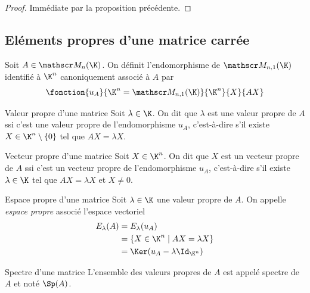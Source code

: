 \begin{proof}
    Immédiate par la proposition précédente. 
\end{proof}

\subsection{Eléments propres d'une matrice carrée }

\begin{definition}{}{}
    Soit $A \in \mathscr M_n(\K)$. On définit l'endomorphisme de $\mathscr M_{n, 1}(\K)$
    identifié à $\K^n$ canoniquement associé à $A$ par 
    $$\fonction{u_A}{\K^n = \mathscr M_{n, 1}(\K)}{\K^n}{X}{AX}$$
\end{definition}

\begin{definition}{Valeur propre d'une matrice}{}
    Soit $\lambda \in \K$. On dit que $\lambda$ est une valeur propre de $A$ ssi
    c'est une valeur propre de l'endomorphisme $u_A$, c'est-à-dire s'il existe 
    $X \in \K^n \setminus \{0\}$ tel que $AX = \lambda X$.
\end{definition}

\begin{definition}{Vecteur propre d'une matrice}{}
    Soit $X \in \K^n$. On dit que $X$ est un vecteur propre de $A$ ssi
    c'est un vecteur propre de l'endomorphisme $u_A$, c'est-à-dire s'il existe 
    $\lambda \in \K$ tel que $AX = \lambda X$ et $X \neq 0$.
\end{definition}

\begin{definition}{Espace propre d'une matrice}{}
    Soit $\lambda \in \K$ une valeur propre de $A$. On appelle \emph{espace propre} 
    associé l'espace vectoriel 
    \begin{align} E_\lambda(A) & = E_\lambda(u_A) \\
                        & = \{ X \in \K^n \mid AX = \lambda X \} \\
                        & = \Ker (u_A - \lambda \Id_{\K^n}) 
    \end{align}
\end{definition}

\begin{definition}{Spectre d'une matrice}{}
    L'ensemble des valeurs propres de $A$ est appelé spectre de $A$ 
    et noté $\Sp(A)$.
    
\end{definition}

